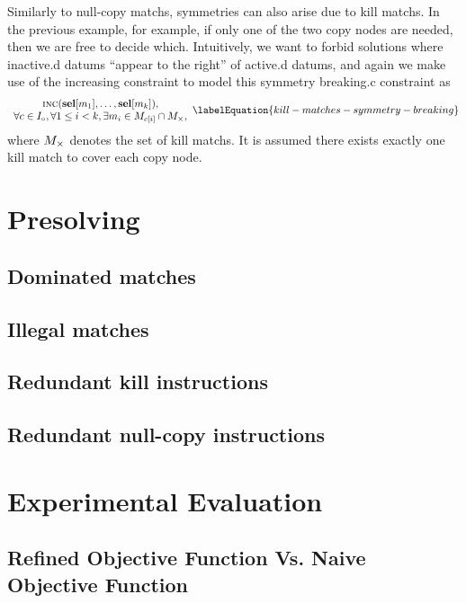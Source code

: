 Similarly to \glspl{null-copy match}, symmetries can also arise due to
\glspl{kill match}.
%
In the previous example, for example, if only one of the two \glspl{copy node}
are needed, then we are free to decide which.
%
Intuitively, we want to forbid \glspl{solution} where \gls{inactive.d}
\glspl{datum} ``appear to the right'' of \gls{active.d} \glspl{datum}, and again
we make use of the \gls{increasing constraint} to model this \gls{symmetry
  breaking.c} \gls{constraint} as
%
\begin{equation}
  \begin{array}{c}
    \mIncreasing(\mVar{sel}[m_1], \ldots, \mVar{sel}[m_k]), \\
    \forall c \in \mInterchDataSet[\mCopy],
    \forall 1 \leq i < k,
    \exists m_i \in \mMatchSet[c[i]] \cap \mKillMatchSet,
  \end{array}
  \labelEquation{kill-matches-symmetry-breaking}
\end{equation}
%
where $\mKillMatchSet$ denotes the set of \glspl{kill match}.
%
It is assumed there exists exactly one \gls{kill match} to cover each \gls{copy
  node}.


\section{Presolving}

\subsection{Dominated matches}
\subsection{Illegal matches}
\subsection{Redundant kill instructions}
\subsection{Redundant null-copy instructions}


\section{Experimental Evaluation}
\subsection{Refined Objective Function Vs. Naive Objective Function}
